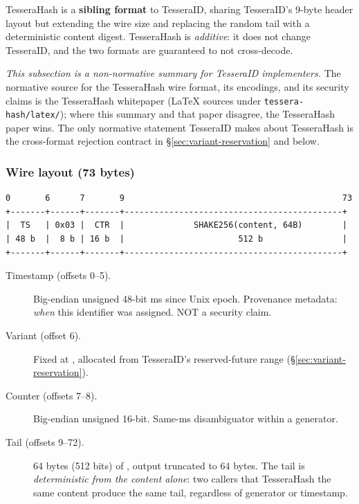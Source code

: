 TesseraHash is a \textbf{sibling format} to TesseraID, sharing TesseraID's 9-byte header layout but extending the wire size and replacing the random tail with a deterministic content digest. TesseraHash is \emph{additive}: it does not change TesseraID, and the two formats are guaranteed to not cross-decode.

\emph{This subsection is a non-normative summary for TesseraID implementers.} The normative source for the TesseraHash wire format, its encodings, and its security claims is the TesseraHash whitepaper (LaTeX sources under \texttt{tessera-hash/latex/}); where this summary and that paper disagree, the TesseraHash paper wins. The only normative statement TesseraID makes about TesseraHash is the cross-format rejection contract in §\ref{sec:variant-reservation} and below.

\subsubsection{Wire layout (73 bytes)}

\begin{lstlisting}
0       6      7       9                                            73
+-------+------+-------+--------------------------------------------+
|  TS   | 0x03 |  CTR  |              SHAKE256(content, 64B)        |
| 48 b  |  8 b | 16 b  |                       512 b                |
+-------+------+-------+--------------------------------------------+
\end{lstlisting}

\begin{description}
  \item[Timestamp (offsets 0--5).] Big-endian unsigned 48-bit ms since Unix epoch. Provenance metadata: \emph{when} this identifier was assigned. NOT a security claim.
  \item[Variant (offset 6).] Fixed at , allocated from TesseraID's reserved-future range (§\ref{sec:variant-reservation}).
  \item[Counter (offsets 7--8).] Big-endian unsigned 16-bit. Same-ms disambiguator within a generator.
  \item[Tail (offsets 9--72).] 64 bytes (512 bits) of  \citep{fips202}, output truncated to 64 bytes. The tail is \emph{deterministic from the content alone}: two callers that TesseraHash the same content produce the same tail, regardless of generator or timestamp.
\end{description}

